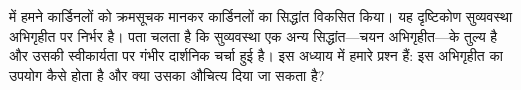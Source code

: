 \documentclass[../../../include/open-logic-section]{subfiles}
\begin{document}


 में हमने
कार्डिनलों को क्रमसूचक मानकर कार्डिनलों का सिद्धांत विकसित किया। यह
दृष्टिकोण सुव्यवस्था अभिगृहीत पर निर्भर है। पता चलता है कि सुव्यवस्था एक
अन्य सिद्धांत---चयन अभिगृहीत---के तुल्य है और उसकी स्वीकार्यता पर गंभीर
दार्शनिक चर्चा हुई है। इस अध्याय में हमारे प्रश्न हैं: इस अभिगृहीत का उपयोग
कैसे होता है और क्या उसका औचित्य दिया जा सकता है?
\end{document}
